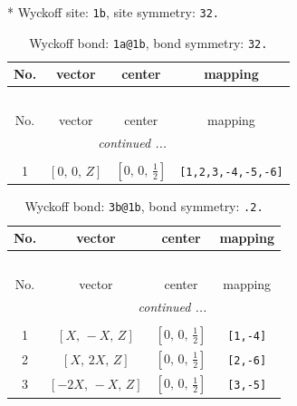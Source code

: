 \documentclass[fleqn,8pt]{jsarticle}
\begin{document}
* Wyckoff site: {\tt 1b}, site symmetry: {\tt 32.}
\renewcommand{\arraystretch}{1.2}
\begin{longtable}{cccc}
\caption{Wyckoff bond: {\tt 1a@1b}, bond symmetry: {\tt 32.}}
 \\
 \hline \hline
No. & vector & center & mapping \\ \hline \endfirsthead

\multicolumn{3}{l}{\tablename\ \thetable{}} \\
 \hline \hline
No. & vector & center & mapping \\ \hline \endhead

 \hline \hline
\multicolumn{3}{r}{\footnotesize\it continued ...} \\ \endfoot

 \hline \hline
\multicolumn{3}{r}{} \\ \endlastfoot

1 & $\left[ 0,\, 0,\, Z \right]$ & $\left[ 0,\, 0,\, \frac{1}{2} \right]$ & {\tt [1,2,3,-4,-5,-6]} \\
\end{longtable}
\renewcommand{\arraystretch}{1.2}
\begin{longtable}{cccc}
\caption{Wyckoff bond: {\tt 3b@1b}, bond symmetry: {\tt .2.}}
 \\
 \hline \hline
No. & vector & center & mapping \\ \hline \endfirsthead

\multicolumn{3}{l}{\tablename\ \thetable{}} \\
 \hline \hline
No. & vector & center & mapping \\ \hline \endhead

 \hline \hline
\multicolumn{3}{r}{\footnotesize\it continued ...} \\ \endfoot

 \hline \hline
\multicolumn{3}{r}{} \\ \endlastfoot

1 & $\left[ X,\, - X,\, Z \right]$ & $\left[ 0,\, 0,\, \frac{1}{2} \right]$ & {\tt [1,-4]} \\ \hline
2 & $\left[ X,\, 2 X,\, Z \right]$ & $\left[ 0,\, 0,\, \frac{1}{2} \right]$ & {\tt [2,-6]} \\ \hline
3 & $\left[ - 2 X,\, - X,\, Z \right]$ & $\left[ 0,\, 0,\, \frac{1}{2} \right]$ & {\tt [3,-5]} \\
\end{longtable}
\renewcommand{\arraystretch}{1.2}
\end{document}
